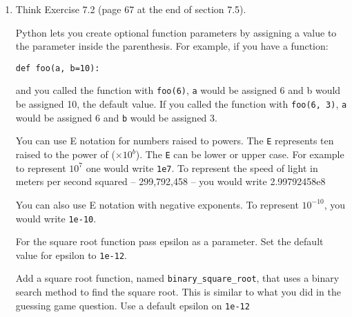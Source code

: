 \documentclass[12pt]{article}
\begin{document}
\begin{enumerate}
\begin{lstlisting}[style=c]
    print '\nYour were thinking of the number {0}'.format(a)


  \end{lstlisting}

Sample Output

\begin{lstlisting}[style=bash]
The guessing game.
Think of a number between 1 and 100 and I will guess it!

is the number greater than 50? (Y/N) y
is the number greater than 75? (Y/N) u
Sorry, I don't understand. Please enter a Y or a N.
is the number greater than 75? (Y/N) k
Sorry, I don't understand. Please enter a Y or a N.
is the number greater than 75? (Y/N) y
is the number greater than 88? (Y/N) n
is the number greater than 82? (Y/N) y
is the number greater than 85? (Y/N) n
is the number greater than 84? (Y/N) n
is the number greater than 83? (Y/N) y
Your were thinking of the number 84
\end{lstlisting}

\item Think Exercise 7.2 (page 67 at the end of section 7.5). 

Python lets you create optional function parameters by assigning a value to the parameter inside the parenthesis. For example, if you have a function:

\texttt{def foo(a, b=10):}

and you called the function with \texttt{foo(6)}, \texttt{a} would be assigned 6 and b would be assigned 10, the default value. If you called the function with \texttt{foo(6, 3)}, \texttt{a} would be assigned 6 and \texttt{b} would  be assigned 3. 

You can use E notation for numbers raised to powers. The \texttt{E} represents ten raised to the power of ($ \times 10^b$). The \texttt{E} can be lower or upper case. For example to represent $10^7$ one would write \texttt{1e7}. To represent the speed of light in meters per second squared -- 299,792,458 -- you would write 2.99792458e8

You can also use E notation with negative exponents. To represent $10^{-10}$, you would write \texttt{1e-10}.

For the square root function pass epsilon as a parameter. Set the default value for epsilon to \texttt{1e-12}.

Add a square root function, named \texttt{binary\_square\_root}, that uses a binary search method to find the square root. This is similar to what you did in the guessing game question. Use a default epsilon on \texttt{1e-12}


\end{enumerate}
\end{document}
